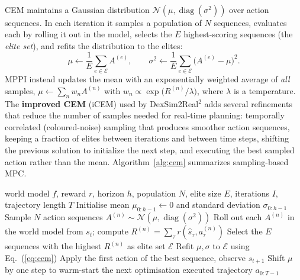 \documentclass[12pt,a4paper,final]{extreport}
\begin{document}
\paragraph{} CEM maintains a Gaussian distribution $\mathcal{N}(\mu,\operatorname{diag}(\sigma^2))$ over action sequences. In each iteration it samples a population of $N$ sequences, evaluates each by rolling it out in the model, selects the $E$ highest-scoring sequences (the \emph{elite set}), and refits the distribution to the elites:
\begin{equation}
\mu \leftarrow \frac{1}{E}\sum_{e\in\mathcal{E}} A^{(e)},\qquad \sigma^{2}\leftarrow\frac{1}{E}\sum_{e\in\mathcal{E}}\big(A^{(e)}-\mu\big)^{2}.
\label{eq:cem}
\end{equation}
MPPI instead updates the mean with an exponentially weighted average of \emph{all} samples, $\mu \leftarrow \sum_n w_n A^{(n)}$ with $w_n \propto \exp\!\big(R^{(n)}/\lambda\big)$, where $\lambda$ is a temperature. The \textbf{improved CEM} (iCEM) \cite{icem} used by DexSim2Real$^2$ adds several refinements that reduce the number of samples needed for real-time planning: temporally correlated (coloured-noise) sampling that produces smoother action sequences, keeping a fraction of elites between iterations and between time steps, shifting the previous solution to initialize the next step, and executing the best sampled action rather than the mean. Algorithm~\ref{alg:cem} summarizes sampling-based MPC.

\begin{algorithm}[htbp]
\caption{Sampling-based MPC with the (improved) Cross-Entropy Method}\label{alg:cem}
\begin{algorithmic}[1]
\Require world model $f$, reward $r$, horizon $h$, population $N$, elite size $E$, iterations $I$, trajectory length $T$
\State Initialise mean $\mu_{0:h-1}\gets 0$ and standard deviation $\sigma_{0:h-1}$
     \State Sample $N$ action sequences $A^{(n)}\sim\mathcal{N}(\mu,\operatorname{diag}(\sigma^2))$ 
     \State Roll out each $A^{(n)}$ in the world model from $s_t$; compute $R^{(n)}=\sum_{\tau}r(\hat{s}_\tau,a^{(n)}_\tau)$
     \State Select the $E$ sequences with the highest $R^{(n)}$ as elite set $\mathcal{E}$ 
     \State Refit $\mu,\sigma$ to $\mathcal{E}$ using Eq.~(\ref{eq:cem})
  \EndFor
  \State Apply the first action of the best sequence, observe $s_{t+1}$
  \State Shift $\mu$ by one step to warm-start the next optimisation
\EndFor
\State \Return executed trajectory $a_{0:T-1}$
\end{algorithmic}
\end{algorithm}
\end{document}
